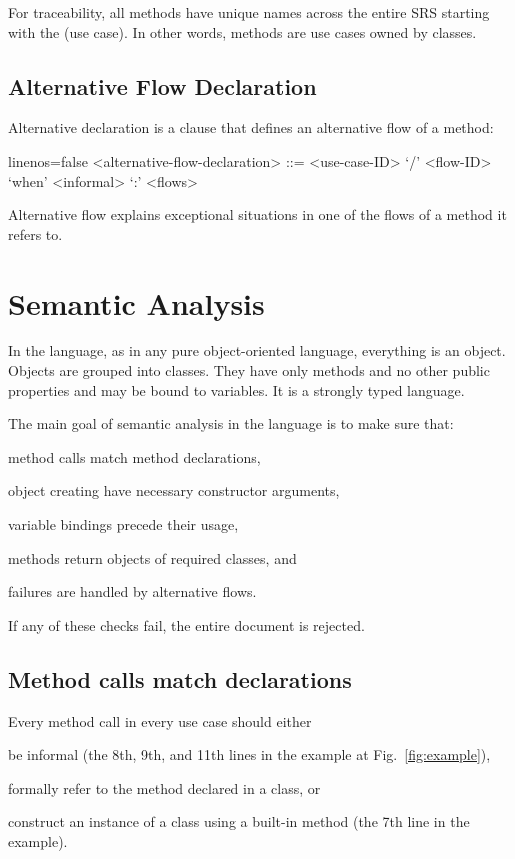 \documentclass[sigplan,10pt,nonacm=true]{acmart}
\begin{document}
For traceability, all methods have unique names across the entire
SRS starting with the  (use case). In other words,
methods are use cases owned by classes.

\subsection{Alternative Flow Declaration}

Alternative declaration is a clause that defines an alternative
flow of a method:

\begin{ffcode*}{linenos=false}
<alternative-flow-declaration> ::= <use-case-ID> `/' <flow-ID> `when' <informal> `:' <flows>
\end{ffcode*}

Alternative flow explains exceptional situations in one of the
flows of a method it refers to.

\section{Semantic Analysis}
\label{sec:semantic}

In the language, as in any pure object-oriented language, everything is
an object. Objects are grouped into classes. They have only methods
and no other public properties and may be bound to variables.
It is a strongly typed language.

The main goal of semantic analysis in the language is to make sure that:
\begin{inparaenum}
\item method calls match method declarations,
\item object creating have necessary constructor arguments,
\item variable bindings precede their usage,
\item methods return objects of required classes, and
\item failures are handled by alternative flows.
\end{inparaenum}
If any of these checks fail, the entire document is rejected.

\subsection{Method calls match declarations}

Every method call in every use case should either
\begin{inparaenum}
\item be informal (the 8th, 9th, and 11th lines in the example at Fig.~\ref{fig:example}),
\item formally refer to the method declared in a class, or
\item construct an instance of a class using a built-in method  (the 7th line in the example).
\end{inparaenum}
\end{document}
